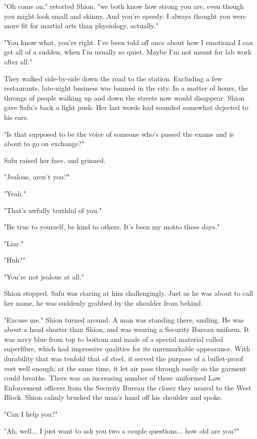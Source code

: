 "Oh come on," retorted Shion, "we both know how strong you are, even
though you might look small and skinny. And you're speedy. I always
thought you were more fit for martial arts than physiology, actually."

"You know what, you're right. I've been told off once about how I
emotional I can get all of a sudden, when I'm usually so quiet. Maybe
I'm not meant for lab work after all."

They walked side-by-side down the road to the station. Excluding a few
restaurants, late-night business was banned in the city. In a matter of
hours, the throngs of people walking up and down the streets now would
disappear. Shion gave Safu's back a light push. Her last words had
sounded somewhat dejected to his ears.

"Is that supposed to be the voice of someone who's passed the exams and
is about to go on exchange?"

Safu raised her face, and grinned.

"Jealous, aren't you?"

"Yeah."

"That's awfully truthful of you."

"Be true to yourself, be kind to others. It's been my motto these days."

"Liar."

"Huh?"

"You're not jealous at all."

Shion stopped. Safu was staring at him challengingly. Just as he was
about to call her name, he was suddenly grabbed by the shoulder from
behind.

"Excuse me." Shion turned around. A man was standing there, smiling. He
was about a head shorter than Shion, and was wearing a Security Bureau
uniform. It was navy blue from top to bottom and made of a special
material called superfibre, which had impressive qualities for its
unremarkable appearance. With durability that was tenfold that of steel,
it served the purpose of a bullet-proof vest well enough; at the same
time, it let air pass through easily so the garment could breathe. There
was an increasing number of these uniformed Law Enforcement officers
from the Security Bureau the closer they neared to the West Block. Shion
calmly brushed the man's hand off his shoulder and spoke.

"Can I help you?"

"Ah, well... I just want to ask you two a couple questions... how old
are you?"

